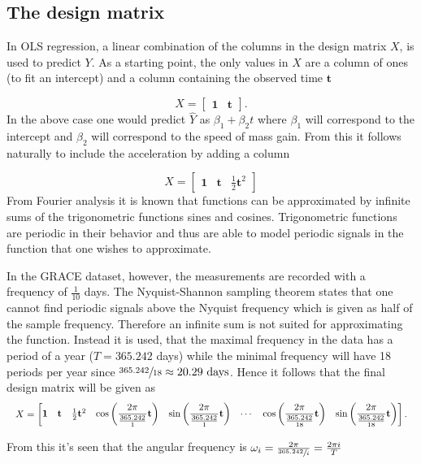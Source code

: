 \subsection{The design matrix}
In OLS regression, a linear combination of the columns in the design matrix $X$, is used to predict $Y$.
As a starting point, the only values in $X$ are a column of ones (to fit an intercept) and a column containing the observed time $\mathbf{t}$

\begin{equation}
X = \left[\begin{matrix} \mathbf{1} & \mathbf{t} \end{matrix}\right].
\end{equation}
In the above case one would predict $\hat{Y}$ as $\beta_1 + \beta_2 t$ where $\beta_1$ will correspond to the intercept and $\beta_2$ will correspond to the speed of mass gain.
From this it follows naturally to include the acceleration by adding a column

\begin{equation}
X = \left[\begin{matrix} \mathbf{1} & \mathbf{t} & \frac{1}{2} \mathbf{t}^2 \end{matrix}\right]
\end{equation} 
From Fourier analysis it is known that functions can be approximated by infinite sums of the trigonometric functions sines and cosines.
Trigonometric functions are periodic in their behavior and thus are able to model periodic signals in the function that one wishes to approximate.

In the GRACE dataset, however, the measurements are recorded with a frequency of $\frac{1}{10}$ days.
The Nyquist-Shannon sampling theorem states that one cannot find periodic signals above the Nyquist frequency which is given as half of the sample frequency. 
Therefore an infinite sum is not suited for approximating the function. 
Instead it is used, that the maximal frequency in the data has a period of a year ($T = 365.242$ days) while the minimal frequency will have 18 periods per year since  $\sfrac{365.242}{18} \approx 20.29 \text{ days}$. Hence it follows that the final design matrix will be given as
\begin{equation*}
\resizebox{\textwidth}{!}{$
X = \left[\begin{matrix}
	\mathbf{1} &
	\mathbf{t} &
	\frac{1}{2} \mathbf{t}^2 &
	\cos\left( \dfrac{2 \pi}{\frac{365.242}{1}} \mathbf{t} \right) &
	\sin\left( \dfrac{2 \pi}{\frac{365.242}{1}} \mathbf{t} \right) &
	\cdots &
	\cos\left( \dfrac{2 \pi}{\frac{365.242}{18}} \mathbf{t} \right) &
	\sin\left( \dfrac{2 \pi}{\frac{365.242}{18}} \mathbf{t} \right)
\end{matrix}\right].
$}
\end{equation*}

From this it's seen that the angular frequency is $\omega_i =  \frac{2 \pi}{\sfrac{365.242}{i}} = \frac{2 \pi i}{T}$
